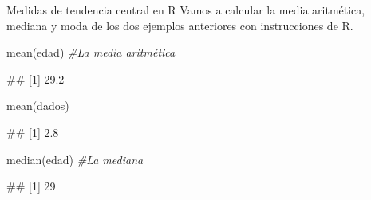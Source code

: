 \documentclass[
  ignorenonframetext,
  aspectratio=169]{beamer}
\newenvironment{Shaded}{\begin{snugshade}}{\end{snugshade}}
\newcommand{\CommentTok}[1]{\textcolor[rgb]{0.56,0.35,0.01}{\textit{#1}}}
\newcommand{\FunctionTok}[1]{\textcolor[rgb]{0.00,0.00,0.00}{#1}}
\newcommand{\NormalTok}[1]{#1}
\let\oldverbatim\verbatim
\let\endoldverbatim\endverbatim
\renewenvironment{verbatim}{\tiny\oldverbatim}{\endoldverbatim}
\begin{document}
\begin{frame}[fragile]{Medidas de tendencia central en R}
\protect\hypertarget{medidas-de-tendencia-central-en-r}{}
Vamos a calcular la media aritmética, mediana y moda de los dos ejemplos
anteriores con instrucciones de R.

\begin{Shaded}
\begin{Highlighting}[]
\FunctionTok{mean}\NormalTok{(edad) }\CommentTok{\#La media aritmética}
\end{Highlighting}
\end{Shaded}

\begin{verbatim}
## [1] 29.2
\end{verbatim}

\begin{Shaded}
\begin{Highlighting}[]
\FunctionTok{mean}\NormalTok{(dados)}
\end{Highlighting}
\end{Shaded}

\begin{verbatim}
## [1] 2.8
\end{verbatim}

\begin{Shaded}
\begin{Highlighting}[]
\FunctionTok{median}\NormalTok{(edad) }\CommentTok{\#La mediana}
\end{Highlighting}
\end{Shaded}

\begin{verbatim}
## [1] 29
\end{verbatim}
\end{frame}
\end{document}
